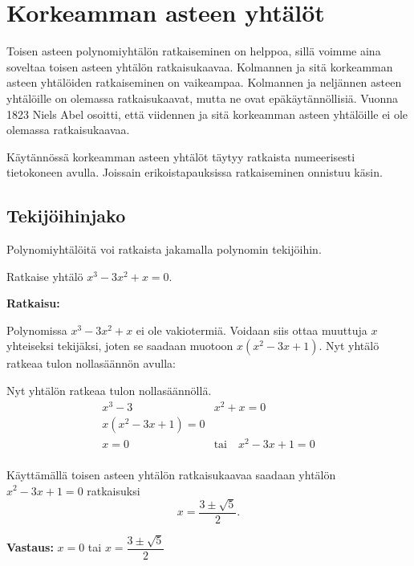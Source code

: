 \section{Korkeamman asteen yhtälöt}
Toisen asteen polynomiyhtälön ratkaiseminen on helppoa, sillä voimme aina soveltaa toisen asteen yhtälön ratkaisukaavaa.
Kolmannen ja sitä korkeamman asteen yhtälöiden ratkaiseminen on vaikeampaa.
Kolmannen ja neljännen asteen yhtälöille on olemassa ratkaisukaavat, mutta ne ovat epäkäytännöllisiä.
Vuonna 1823 Niels Abel osoitti, että viidennen ja sitä korkeamman asteen yhtälöille ei ole olemassa ratkaisukaavaa.

Käytännössä korkeamman asteen yhtälöt täytyy ratkaista numeerisesti tietokoneen avulla. Joissain erikoistapauksissa ratkaiseminen onnistuu käsin.

\subsection*{Tekijöihinjako}

Polynomiyhtälöitä voi ratkaista jakamalla polynomin tekijöihin.


\begin{esimerkki}
Ratkaise yhtälö $x^3 - 3x^2 + x = 0$.

\textbf{Ratkaisu:}

Polynomissa $x^3 - 3x^2 + x$ ei ole vakiotermiä. Voidaan siis ottaa muuttuja $x$ yhteiseksi tekijäksi, joten se saadaan muotoon $x(x^2 - 3x + 1)$. Nyt yhtälö ratkeaa tulon nollasäännön avulla:

Nyt yhtälön ratkeaa tulon nollasäännöllä.
\begin{align*}
x^3 - 3&x^2 + x=0 \\
x(x^2 - 3x + 1)=0 \\
x= 0 \quad &\text{tai} \quad x^2 - 3x + 1 = 0 \\
\end{align*}

Käyttämällä toisen asteen yhtälön ratkaisukaavaa saadaan yhtälön $x^2 - 3x + 1 = 0$ ratkaisuksi
\[x = \frac{3\pm \sqrt{5}}{2}.\]

\textbf{Vastaus:}
$x= 0$ tai $x=\dfrac{3\pm \sqrt{5}}{2}$
\end{esimerkki}


